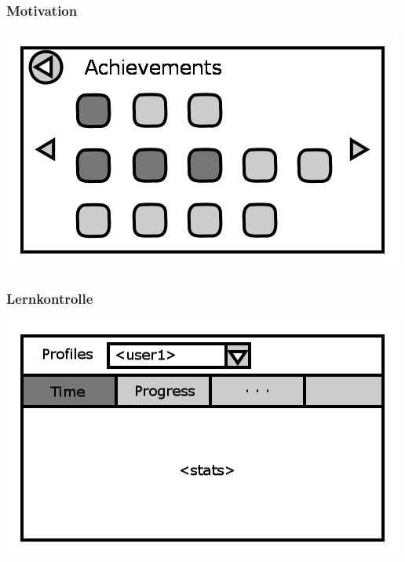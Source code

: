 \documentclass[t]{beamer}
\begin{document}
\begin{frame}
	\frametitle{Motivation}
	\includegraphics[height=\textheight]{achievements.png}
\end{frame}
\begin{frame}
	\frametitle{Lernkontrolle}
	\includegraphics[height=\textheight]{stats.png}
\end{frame}
\end{document}
